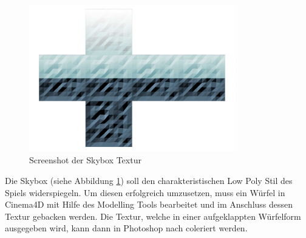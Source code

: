 
\begin{figure}[!htbp]
	\centering
		\includegraphics[width=0.8\textwidth]{images/Skybox}
	\caption{Screenshot der Skybox Textur}
	\label{fig:Skybox}
\end{figure}

Die Skybox (siehe Abbildung \ref{fig:Skybox}) soll den charakteristischen Low Poly Stil des Spiels widerspiegeln. Um diesen erfolgreich umzusetzen, muss ein Würfel in Cinema4D mit Hilfe des Modelling Tools bearbeitet und im Anschluss dessen Textur gebacken werden. Die Textur, welche in einer aufgeklappten Würfelform ausgegeben wird, kann dann in Photoshop nach coleriert werden.